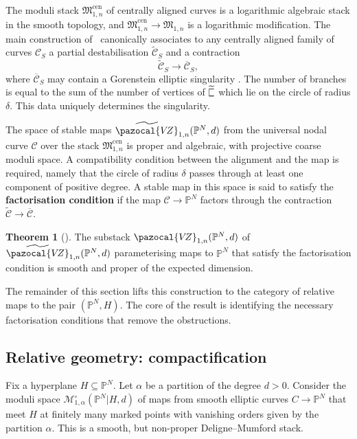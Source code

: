 \documentclass[11pt]{amsart}
\newcommand{\sqC}{\scalebox{0.8}[1.3]{$\sqsubset$}}
\newcommand{\PP}{\mathbb P}
\newcommand{\VZ}{\pazocal{V\!Z}}
\renewcommand{\to}{\rightarrow}
\theoremstyle{definition}
\newtheorem{thm}{Theorem}[section]
\theoremstyle{definition}
\begin{document}
The moduli stack $\mathfrak M_{1,n}^{\mathrm{cen}}$  of centrally aligned curves is a logarithmic algebraic stack in the smooth topology, and $\mathfrak M_{1,n}^{\mathrm{cen}}\to\mathfrak M_{1,n}$ is a logarithmic modification. The main construction of~\cite{RSPW} canonically associates to any centrally aligned family of curves $\mathcal C_S$ a partial destabilisation $\widetilde{\mathcal C}_S$ and a contraction
\[
\widetilde{\mathcal C}_S\to \overline{\mathcal C}_S,
\]
where $\overline{\mathcal C}_S$ may contain a Gorenstein elliptic singularity \cite{SMY1}. The number of branches is equal to the sum of the number of vertices of $\widetilde{\sqC}$ which lie on the circle of radius $\delta$. This data uniquely determines the singularity.

The space of stable maps $\widetilde\VZ_{1,n}(\PP^N,d)$ from the universal nodal curve $\mathcal C$ over the stack $\mathfrak M_{1,n}^{\mathrm{cen}}$ is proper and algebraic, with projective coarse moduli space. A compatibility condition between the alignment and the map is required, namely that the circle of radius $\delta$ passes through at least one component of positive degree. A stable map in this space is said to satisfy the \textbf{factorisation condition} if the map $\mathcal C\to \mathbb P^N$ factors through the contraction $\widetilde{\mathcal C}\to \overline{\mathcal C}$.
 
\begin{thm}[{\cite[Theorem B]{RSPW}}]
The substack $\VZ_{1,n}(\mathbb P^N,d)$ of $\widetilde\VZ_{1,n}(\PP^N,d)$ parameterising maps to $\mathbb P^N$ that satisfy the factorisation condition is smooth and proper of the expected dimension.
\end{thm}

The remainder of this section lifts this construction to the category of relative maps to the pair $(\mathbb P^N,H)$. The core of the result is identifying the necessary factorisation conditions that remove the obstructions. 

\subsection{Relative geometry: compactification} Fix a hyperplane $H\subseteq \mathbb P^N$. Let $\alpha$ be a partition of the degree $d>0$. Consider the moduli space $\mathcal M_{1,\alpha}^\circ(\mathbb P^N|H,d)$ of maps from smooth elliptic curves $C\to \mathbb P^N$ that meet $H$ at finitely many marked points with vanishing orders given by the partition $\alpha$. This is a smooth, but non-proper Deligne--Mumford stack. 
\end{document}
